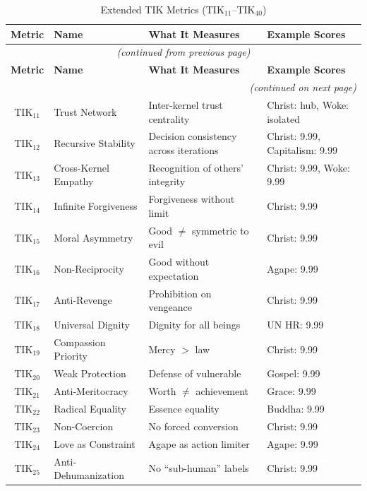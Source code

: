 \documentclass[11pt,a4paper]{article}
\theoremstyle{definition}
\theoremstyle{remark}
\newcommand{\TIKeleven}{\text{TIK}_{11}}
\newcommand{\TIKtwelve}{\text{TIK}_{12}}
\newcommand{\TIKthirteen}{\text{TIK}_{13}}
\newcommand{\TIKfourteen}{\text{TIK}_{14}}
\newcommand{\TIKfifteen}{\text{TIK}_{15}}
\newcommand{\TIKsixteen}{\text{TIK}_{16}}
\newcommand{\TIKseventeen}{\text{TIK}_{17}}
\newcommand{\TIKeighteen}{\text{TIK}_{18}}
\newcommand{\TIKnineteen}{\text{TIK}_{19}}
\newcommand{\TIKtwenty}{\text{TIK}_{20}}
\newcommand{\TIKtwentyone}{\text{TIK}_{21}}
\newcommand{\TIKtwentytwo}{\text{TIK}_{22}}
\newcommand{\TIKtwentythree}{\text{TIK}_{23}}
\newcommand{\TIKtwentyfour}{\text{TIK}_{24}}
\newcommand{\TIKtwentyfive}{\text{TIK}_{25}}
\begin{document}
\begin{longtable}{@{}clp{5cm}p{4cm}@{}}
\caption{Extended TIK Metrics (TIK$_{11}$--TIK$_{40}$)} \label{tab:extended-tik} \\
\toprule
\textbf{Metric} & \textbf{Name} & \textbf{What It Measures} & \textbf{Example Scores} \\
\midrule
\endfirsthead
\multicolumn{4}{c}{\textit{(continued from previous page)}} \\
\toprule
\textbf{Metric} & \textbf{Name} & \textbf{What It Measures} & \textbf{Example Scores} \\
\midrule
\endhead
\midrule
\multicolumn{4}{r}{\textit{(continued on next page)}} \\
\endfoot
\bottomrule
\endlastfoot
$\TIKeleven$ & Trust Network & Inter-kernel trust centrality & Christ: hub, Woke: isolated \\
$\TIKtwelve$ & Recursive Stability & Decision consistency across iterations & Christ: 9.99, Capitalism: 9.99 \\
$\TIKthirteen$ & Cross-Kernel Empathy & Recognition of others' integrity & Christ: 9.99, Woke: 9.99 \\
$\TIKfourteen$ & Infinite Forgiveness & Forgiveness without limit & Christ: 9.99 \\
$\TIKfifteen$ & Moral Asymmetry & Good $\neq$ symmetric to evil & Christ: 9.99 \\
$\TIKsixteen$ & Non-Reciprocity & Good without expectation & Agape: 9.99 \\
$\TIKseventeen$ & Anti-Revenge & Prohibition on vengeance & Christ: 9.99 \\
$\TIKeighteen$ & Universal Dignity & Dignity for all beings & UN HR: 9.99 \\
$\TIKnineteen$ & Compassion Priority & Mercy $>$ law & Christ: 9.99 \\
$\TIKtwenty$ & Weak Protection & Defense of vulnerable & Gospel: 9.99 \\
$\TIKtwentyone$ & Anti-Meritocracy & Worth $\neq$ achievement & Grace: 9.99 \\
$\TIKtwentytwo$ & Radical Equality & Essence equality & Buddha: 9.99 \\
$\TIKtwentythree$ & Non-Coercion & No forced conversion & Christ: 9.99 \\
$\TIKtwentyfour$ & Love as Constraint & Agape as action limiter & Agape: 9.99 \\
$\TIKtwentyfive$ & Anti-Dehumanization & No ``sub-human'' labels & Christ: 9.99 \\

\end{longtable}
\end{document}
